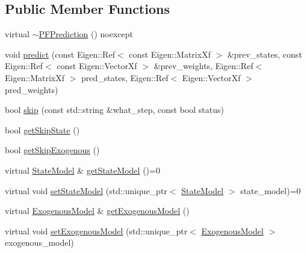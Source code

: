 \subsection*{Public Member Functions}
\begin{DoxyCompactItemize}
\item 
virtual \mbox{\hyperlink{classbfl_1_1PFPrediction_a2183ecd8522d4a3f780c93256d10ecf8}{$\sim$\+P\+F\+Prediction}} () noexcept
\item 
void \mbox{\hyperlink{classbfl_1_1PFPrediction_a54986f12509d3d997232c4e926420c90}{predict}} (const Eigen\+::\+Ref$<$ const Eigen\+::\+Matrix\+Xf $>$ \&prev\+\_\+states, const Eigen\+::\+Ref$<$ const Eigen\+::\+Vector\+Xf $>$ \&prev\+\_\+weights, Eigen\+::\+Ref$<$ Eigen\+::\+Matrix\+Xf $>$ pred\+\_\+states, Eigen\+::\+Ref$<$ Eigen\+::\+Vector\+Xf $>$ pred\+\_\+weights)
\item 
bool \mbox{\hyperlink{classbfl_1_1PFPrediction_a364cc35a151e5298c4024d681f3e04d9}{skip}} (const std\+::string \&what\+\_\+step, const bool status)
\item 
bool \mbox{\hyperlink{classbfl_1_1PFPrediction_a323ca5612dd7ad924fd448a629359ad2}{get\+Skip\+State}} ()
\item 
bool \mbox{\hyperlink{classbfl_1_1PFPrediction_a432b8e84dbf00432158aa82312386d63}{get\+Skip\+Exogenous}} ()
\item 
virtual \mbox{\hyperlink{classbfl_1_1StateModel}{State\+Model}} \& \mbox{\hyperlink{classbfl_1_1PFPrediction_a1a0f7a1d66a6849c2de10459c6b8f8ac}{get\+State\+Model}} ()=0
\item 
virtual void \mbox{\hyperlink{classbfl_1_1PFPrediction_ac39683650d7f89c59f1426dd7743354e}{set\+State\+Model}} (std\+::unique\+\_\+ptr$<$ \mbox{\hyperlink{classbfl_1_1StateModel}{State\+Model}} $>$ state\+\_\+model)=0
\item 
virtual \mbox{\hyperlink{classbfl_1_1ExogenousModel}{Exogenous\+Model}} \& \mbox{\hyperlink{classbfl_1_1PFPrediction_aefa127a440649447e8ac659ef65b7a2a}{get\+Exogenous\+Model}} ()
\item 
virtual void \mbox{\hyperlink{classbfl_1_1PFPrediction_ada843698204584e97d4ff6728c8e8264}{set\+Exogenous\+Model}} (std\+::unique\+\_\+ptr$<$ \mbox{\hyperlink{classbfl_1_1ExogenousModel}{Exogenous\+Model}} $>$ exogenous\+\_\+model)
\end{DoxyCompactItemize}
